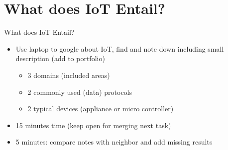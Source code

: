 ﻿\section{What does IoT Entail?}

\begin{frame}{What does IoT Entail?}
\begin{itemize}
    \item Use laptop to \alert{google about IoT}, find and note down including small description (add to portfolio)
\begin{itemize}
    \item 3 \alert{domains} (included areas)
    \item 2 commonly used (data) \alert{protocols}
    \item 2 typical \alert{devices} (appliance or micro controller)
\end{itemize}
    \item 15 minutes time (keep open for merging next task)
    \item 5 minutes: compare notes with neighbor and add missing results
\end{itemize}
\end{frame}
